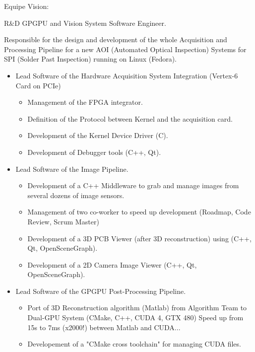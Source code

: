 \documentclass{article}
\begin{document}
\begin{llist}
{Equipe Vision:

}

 {
R\&D GPGPU and Vision System Software Engineer.\\
\vspace{-0.33cm}

Responsible for the design and development of the whole Acquisition and Processing Pipeline
for a new AOI (Automated Optical Inspection) Systems for SPI (Solder Past Inspection)
 running on Linux (Fedora).
\begin{itemize}
\item Lead Software of the Hardware Acquisition System Integration (Vertex-6 Card on PCIe)
\begin{itemize}
\item Management of the FPGA integrator.
\item Definition of the Protocol between Kernel and the acquisition card.
\item Development of the Kernel Device Driver (C).
\item Development of Debugger tools (C++, Qt).
\end{itemize}
\item Lead Software of the Image Pipeline.
\begin{itemize}
\item Development of a C++ Middleware to grab and manage images from several dozens of image sensors.
\item Management of two co-worker to speed up development (Roadmap, Code Review, Scrum Master)
\item Development of a 3D PCB Viewer (after 3D reconstruction) using (C++, Qt, OpenSceneGraph).
\item Development of a 2D Camera Image Viewer (C++, Qt, OpenSceneGraph).
\end{itemize}
\item Lead Software of the GPGPU Post-Processing Pipeline.
\begin{itemize}
\item Port of 3D Reconstruction algorithm (Matlab) from Algorithm Team to Dual-GPU System (CMake, C++, CUDA 4, GTX 480)
 Speed up from 15s to 7ms (x2000!) between Matlab and CUDA...
\item Developement of a "CMake cross toolchain" for managing CUDA files.
\end{itemize}
\end{itemize}

}
\end{llist}
\end{document}
